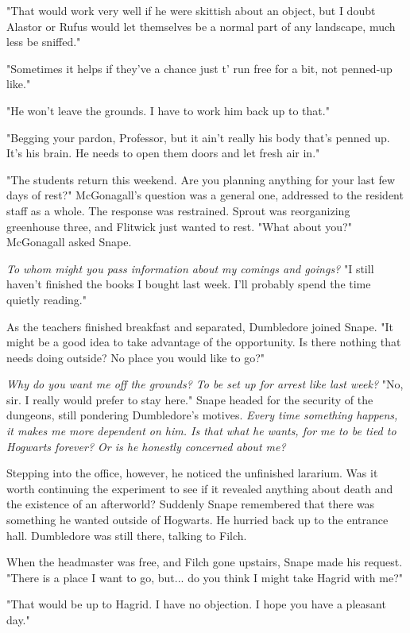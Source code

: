 \documentclass[a4paper,11pt]{article}
\begin{document}
"That would work very well if he were skittish about an object, but I doubt Alastor or Rufus would let themselves be a normal part of any landscape, much less be sniffed."

"Sometimes it helps if they've a chance just t' run free for a bit, not penned-up like."

"He won't leave the grounds. I have to work him back up to that."

"Begging your pardon, Professor, but it ain't really his body that's penned up. It's his brain. He needs to open them doors and let fresh air in."

"The students return this weekend. Are you planning anything for your last few days of rest?" McGonagall's question was a general one, addressed to the resident staff as a whole. The response was restrained. Sprout was reorganizing greenhouse three, and Flitwick just wanted to rest. "What about you?" McGonagall asked Snape.

\emph{To whom might you pass information about my comings and goings?} "I still haven't finished the books I bought last week. I'll probably spend the time quietly reading."

As the teachers finished breakfast and separated, Dumbledore joined Snape. "It might be a good idea to take advantage of the opportunity. Is there nothing that needs doing outside? No place you would like to go?"

\emph{Why do you want me off the grounds? To be set up for arrest like last week?} "No, sir. I really would prefer to stay here." Snape headed for the security of the dungeons, still pondering Dumbledore's motives. \emph{Every time something happens, it makes me more dependent on him. Is that what he wants, for me to be tied to Hogwarts forever? Or is he honestly concerned about me?}

Stepping into the office, however, he noticed the unfinished lararium. Was it worth continuing the experiment to see if it revealed anything about death and the existence of an afterworld? Suddenly Snape remembered that there was something he wanted outside of Hogwarts. He hurried back up to the entrance hall. Dumbledore was still there, talking to Filch.

When the headmaster was free, and Filch gone upstairs, Snape made his request. "There is a place I want to go, but... do you think I might take Hagrid with me?"

"That would be up to Hagrid. I have no objection. I hope you have a pleasant day."
\end{document}
